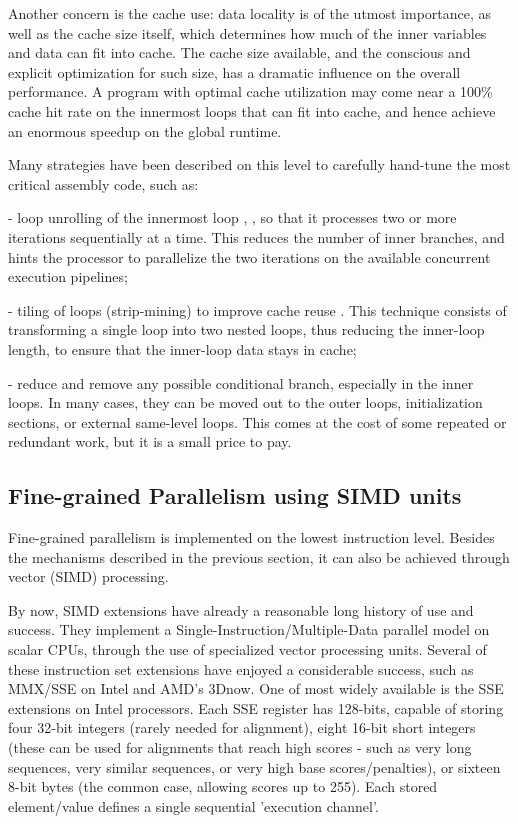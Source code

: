 Another concern is the cache use: data locality is of the utmost importance, as well as the cache size itself, which determines how much of the inner variables and data can fit into cache. The cache size available, and the conscious and explicit optimization for such size, has a dramatic influence on the overall performance. A program with optimal cache utilization may come near a 100\% cache hit rate on the innermost loops that can fit into cache, and hence achieve an enormous speedup on the global runtime.

Many strategies have been described on this level to carefully hand-tune the most critical assembly code, such as:

- loop unrolling of the innermost loop \cite{alpern}, \cite{rognes2011}, so that it processes two or more iterations sequentially at a time. This reduces the number of inner branches, and hints the processor to parallelize the two iterations on the available concurrent execution pipelines;

- tiling of loops (strip-mining) to improve cache reuse \cite{alpern}. This technique consists of transforming a single loop into two nested loops, thus reducing the inner-loop length, to ensure that the inner-loop data stays in cache;

- reduce and remove any possible conditional branch, especially in the inner loops. In many cases, they can be moved out to the outer loops, initialization sections, or external same-level loops. This comes at the cost of some repeated or redundant work, but it is a small price to pay.
	




\subsection{Fine-grained Parallelism using SIMD units}

Fine-grained parallelism is implemented on the lowest instruction level. Besides the mechanisms described in the previous section, it can also be achieved through vector (SIMD) processing.

By now, SIMD extensions have already a reasonable long history of use and success. They implement a Single-Instruction/Multiple-Data parallel model on scalar CPUs, through the use of specialized vector processing units. Several of these instruction set extensions have enjoyed a considerable success, such as MMX/SSE on Intel and AMD's 3Dnow. One of most widely available is the SSE extensions on Intel processors. Each SSE register has 128-bits, capable of storing four 32-bit integers (rarely needed for alignment), eight 16-bit short integers (these can be used for alignments that reach high scores - such as very long sequences, very similar sequences, or very high base scores/penalties), or sixteen 8-bit bytes (the common case, allowing scores up to 255). Each stored element/value defines a single sequential 'execution channel'.

